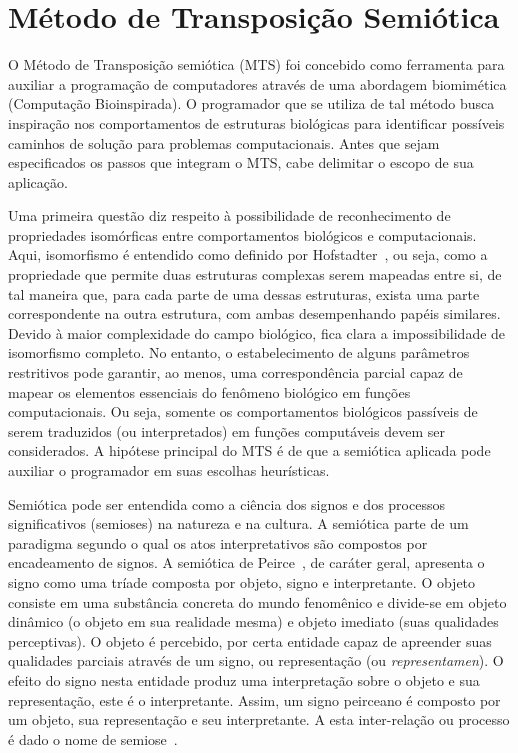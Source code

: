 \chapter{Método de Transposição Semiótica}

O Método de Transposição semiótica (MTS) foi concebido como ferramenta para auxiliar a programação de computadores através de uma abordagem biomimética (Computação Bioinspirada). O programador que se utiliza de tal método busca inspiração nos comportamentos de estruturas biológicas para identificar possíveis caminhos de solução para problemas computacionais. Antes que sejam especificados os passos que integram o MTS, cabe delimitar o escopo de sua aplicação.

Uma primeira questão diz respeito à possibilidade de reconhecimento de propriedades isomórficas entre comportamentos biológicos e computacionais. Aqui, isomorfismo é entendido como definido por Hofstadter~\cite{hofstadter79}, ou seja, como a propriedade que permite duas estruturas complexas serem mapeadas entre si, de tal maneira que, para cada parte de uma dessas estruturas, exista uma parte correspondente na outra estrutura, com ambas desempenhando papéis similares. Devido à maior complexidade do campo biológico, fica clara a impossibilidade de isomorfismo completo. No entanto, o estabelecimento de alguns parâmetros restritivos pode garantir, ao menos, uma correspondência parcial capaz de mapear os elementos essenciais do fenômeno biológico em funções computacionais. Ou seja, somente os comportamentos biológicos passíveis de serem traduzidos (ou interpretados) em funções computáveis devem ser considerados. A hipótese principal do MTS é de que a semiótica aplicada pode auxiliar o programador em suas escolhas heurísticas.

Semiótica pode ser entendida como a ciência dos signos e dos processos significativos (semioses) na natureza e na cultura. A semiótica parte de um paradigma segundo o qual os atos interpretativos são compostos por encadeamento de signos. A semiótica de Peirce~\cite{peirce08}, de caráter geral, apresenta o signo como uma tríade composta por objeto, signo e interpretante. O objeto consiste em uma substância concreta do mundo fenomênico e divide-se em objeto dinâmico (o objeto em sua realidade mesma) e objeto imediato (suas qualidades perceptivas). O objeto é percebido, por certa entidade capaz de apreender suas qualidades parciais através de um signo, ou representação (ou \textit{representamen}). O efeito do signo nesta entidade produz uma interpretação sobre o objeto e sua representação, este é o interpretante. Assim, um signo peirceano é composto por um objeto, sua representação e seu interpretante. A esta inter-relação ou processo é dado o nome de semiose~\cite{peirce1940philosophical}.

